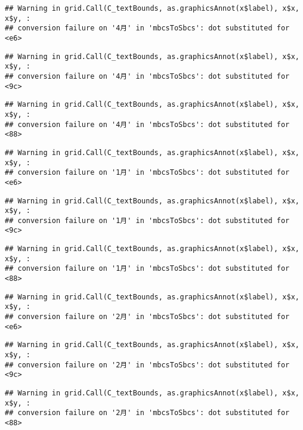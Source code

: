 \documentclass[]{ctexart}
\begin{document}
\begin{verbatim}
## Warning in grid.Call(C_textBounds, as.graphicsAnnot(x$label), x$x, x$y, :
## conversion failure on '4月' in 'mbcsToSbcs': dot substituted for <e6>
\end{verbatim}

\begin{verbatim}
## Warning in grid.Call(C_textBounds, as.graphicsAnnot(x$label), x$x, x$y, :
## conversion failure on '4月' in 'mbcsToSbcs': dot substituted for <9c>
\end{verbatim}

\begin{verbatim}
## Warning in grid.Call(C_textBounds, as.graphicsAnnot(x$label), x$x, x$y, :
## conversion failure on '4月' in 'mbcsToSbcs': dot substituted for <88>
\end{verbatim}

\begin{verbatim}
## Warning in grid.Call(C_textBounds, as.graphicsAnnot(x$label), x$x, x$y, :
## conversion failure on '1月' in 'mbcsToSbcs': dot substituted for <e6>
\end{verbatim}

\begin{verbatim}
## Warning in grid.Call(C_textBounds, as.graphicsAnnot(x$label), x$x, x$y, :
## conversion failure on '1月' in 'mbcsToSbcs': dot substituted for <9c>
\end{verbatim}

\begin{verbatim}
## Warning in grid.Call(C_textBounds, as.graphicsAnnot(x$label), x$x, x$y, :
## conversion failure on '1月' in 'mbcsToSbcs': dot substituted for <88>
\end{verbatim}

\begin{verbatim}
## Warning in grid.Call(C_textBounds, as.graphicsAnnot(x$label), x$x, x$y, :
## conversion failure on '2月' in 'mbcsToSbcs': dot substituted for <e6>
\end{verbatim}

\begin{verbatim}
## Warning in grid.Call(C_textBounds, as.graphicsAnnot(x$label), x$x, x$y, :
## conversion failure on '2月' in 'mbcsToSbcs': dot substituted for <9c>
\end{verbatim}

\begin{verbatim}
## Warning in grid.Call(C_textBounds, as.graphicsAnnot(x$label), x$x, x$y, :
## conversion failure on '2月' in 'mbcsToSbcs': dot substituted for <88>
\end{verbatim}
\end{document}
